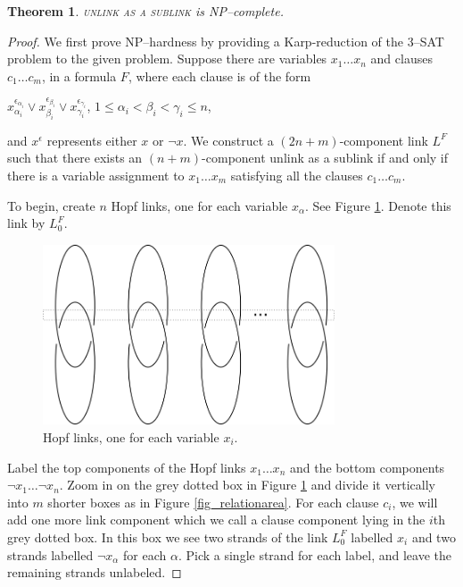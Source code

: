 \documentclass[12pt]{amsart}
\newtheorem{thm}{Theorem}
\theoremstyle{definition}
\theoremstyle{remark}
\begin{document}
\begin{thm}
\textsc{unlink as a sublink} is NP--complete.
\label{thm_unlinksublink}
\end{thm}
\begin{proof}
We first prove NP--hardness by providing a Karp-reduction of the \textsc{3--SAT} problem to the given problem.  Suppose there are variables $x_1 \dots x_n$ and clauses $c_1\dots c_m$, in a formula $F$, where each clause is of the form
\begin{center}$x_{\alpha_i}^{\epsilon_{\alpha_i}} \vee x_{\beta_i}^{\epsilon_{\beta_i}} \vee x_{\gamma_i}^{\epsilon_{\gamma_i}}$, $1 \le \alpha_i < \beta_i < \gamma_i \le n$,
\end{center}

\noindent and $x^\epsilon$ represents either $x$ or $\neg x$.  We construct a $(2n+m)$-component link $L^F$ such that there exists an $(n+m)$-component unlink as a sublink if and only if there is a variable assignment to $x_1 \dots x_m$ satisfying all the clauses $c_1 \dots c_m$.


To begin, create $n$ Hopf links, one for each variable $x_\alpha$.  See Figure \ref{fig_hopf}.  Denote this link by $L_0^F$.

\begin{figure}[ht]
\centering
\includegraphics[height=2.1in]{hopfs.png}
\caption{Hopf links, one for each variable $x_i$.}
\label{fig_hopf}
\end{figure}




Label the top components of the Hopf links $x_1 \dots x_n$ and the bottom components $\neg x_1 \dots \neg x_n$.  Zoom in on the grey dotted box in Figure \ref{fig_hopf} and divide it vertically into $m$ shorter boxes as in Figure \ref{fig_relationarea}.  For each clause $c_i$, we will add one more link component which we call a clause component lying in the $i$th grey dotted box. In this box we see two strands of the link $L_0^F$ labelled $x_i$ and two strands labelled $\neg x_\alpha$ for each $\alpha$. Pick a single strand for each label, and leave the remaining strands unlabeled.



\end{proof}
\end{document}
